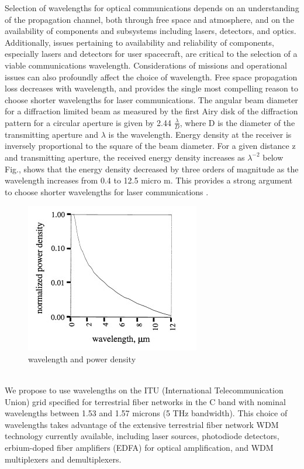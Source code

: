 Selection of wavelengths for optical communications depends on an understanding of the propagation channel, both through free space and atmosphere, and on the availability of components and subsystems including lasers, detectors, and optics. Additionally, issues pertaining to availability and reliability of components, especially lasers and detectors for user spacecraft, are critical to the selection of a viable communications wavelength. Considerations of missions and operational issues can also profoundly affect the choice of wavelength. Free space propagation loss decreases with wavelength, and provides the single most compelling reason to choose shorter wavelengths for laser communications. The angular beam diameter for a diffraction limited beam as measured by the first Airy disk of the diffraction pattern for a circular aperture is given by 2.44 $\tfrac{\lambda}{D}$, where D is the diameter of the transmitting aperture and $\lambda$ is the wavelength. Energy density at the receiver is inversely proportional to the square of the beam diameter. For a given distance z and transmitting aperture, the received energy density increases as $\lambda^{-2}$ below Fig., shows that the energy density decreased by three orders of magnitude as the wavelength increases from 0.4 to 12.5 micro m. This provides a strong argument to choose shorter wavelengths for laser communications \cite{wavelength}.
\begin{figure}[htb]
\begin{center}
\includegraphics[width=0.7\columnwidth]{figures/laser-communication/bh4.jpg}
\caption{wavelength and power density}
\end{center}
\end{figure}
\\
We propose to use wavelengths on the ITU (International Telecommunication Union) grid specified for terrestrial fiber networks in the C band with nominal wavelengths between 1.53 and 1.57 microns (5 THz bandwidth). This choice of wavelengths takes advantage of the extensive terrestrial fiber network WDM technology currently available, including laser sources, photodiode detectors, erbium-doped fiber amplifiers (EDFA) for optical amplification, and WDM multiplexers and demultiplexers. 

